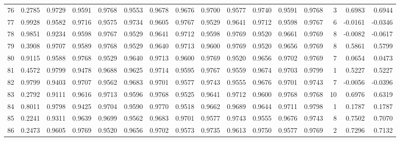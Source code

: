 \begin{tabular}{lrrrrrrrrrrrrrrr}
76  &      0.2785 &  0.9729 &  0.9591 &  0.9768 &  0.9553 &  0.9678 &  0.9676 &  0.9700 &  0.9577 &  0.9740 &   0.9591 &     0.9768 &      3 &                    0.6983 &                     0.6944 \\
77  &      0.9928 &  0.9582 &  0.9716 &  0.9575 &  0.9734 &  0.9605 &  0.9767 &  0.9529 &  0.9641 &  0.9712 &   0.9598 &     0.9767 &      6 &                   -0.0161 &                    -0.0346 \\
78  &      0.9851 &  0.9234 &  0.9598 &  0.9767 &  0.9529 &  0.9641 &  0.9712 &  0.9598 &  0.9769 &  0.9520 &   0.9661 &     0.9769 &      8 &                   -0.0082 &                    -0.0617 \\
79  &      0.3908 &  0.9707 &  0.9589 &  0.9768 &  0.9529 &  0.9640 &  0.9713 &  0.9600 &  0.9769 &  0.9520 &   0.9656 &     0.9769 &      8 &                    0.5861 &                     0.5799 \\
80  &      0.9115 &  0.9588 &  0.9768 &  0.9529 &  0.9640 &  0.9713 &  0.9600 &  0.9769 &  0.9520 &  0.9656 &   0.9702 &     0.9769 &      7 &                    0.0654 &                     0.0473 \\
81  &      0.4572 &  0.9799 &  0.9478 &  0.9688 &  0.9625 &  0.9714 &  0.9595 &  0.9767 &  0.9559 &  0.9674 &   0.9703 &     0.9799 &      1 &                    0.5227 &                     0.5227 \\
82  &      0.9799 &  0.9403 &  0.9707 &  0.9562 &  0.9683 &  0.9701 &  0.9577 &  0.9743 &  0.9555 &  0.9676 &   0.9701 &     0.9743 &      7 &                   -0.0056 &                    -0.0396 \\
83  &      0.2792 &  0.9111 &  0.9616 &  0.9713 &  0.9596 &  0.9768 &  0.9525 &  0.9641 &  0.9712 &  0.9600 &   0.9768 &     0.9768 &     10 &                    0.6976 &                     0.6319 \\
84  &      0.8011 &  0.9798 &  0.9425 &  0.9704 &  0.9590 &  0.9770 &  0.9518 &  0.9662 &  0.9689 &  0.9644 &   0.9711 &     0.9798 &      1 &                    0.1787 &                     0.1787 \\
85  &      0.2241 &  0.9311 &  0.9639 &  0.9699 &  0.9562 &  0.9683 &  0.9701 &  0.9577 &  0.9743 &  0.9555 &   0.9676 &     0.9743 &      8 &                    0.7502 &                     0.7070 \\
86  &      0.2473 &  0.9605 &  0.9769 &  0.9520 &  0.9656 &  0.9702 &  0.9573 &  0.9735 &  0.9613 &  0.9750 &   0.9577 &     0.9769 &      2 &                    0.7296 &                     0.7132 \\

\end{tabular}
